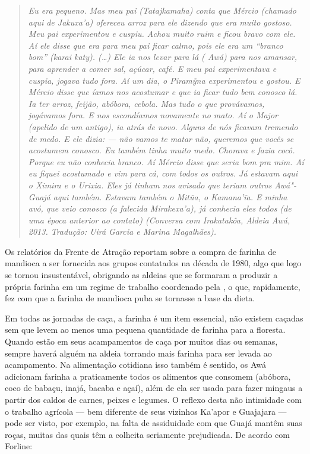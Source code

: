 \begin{quote}
\emph{Eu era pequeno. Mas meu pai (Tatajkamaha) conta que Mércio
(chamado aqui de Jakuxa'a) ofereceu arroz para ele dizendo que era muito
gostoso. Meu pai experimentou e cuspiu. Achou muito ruim e ficou bravo
com ele. Aí ele disse que era para meu pai ficar calmo, pois ele era um
``branco bom'' (karai katy). (\ldots{}) Ele ia nos levar para lá ( Awá)
para nos amansar, para aprender a comer sal, açúcar, café. E meu pai
experimentava e cuspia, jogava tudo fora. Aí um dia, o Piramỹna
experimentou e gostou. E Mércio disse que íamos nos acostumar e que ia
ficar tudo bem conosco lá. Ia ter arroz, feijão, abóbora, cebola. Mas
tudo o que provávamos, jogávamos fora. E nos escondíamos novamente no
mato. Aí o Major (apelido de um antigo), ia atrás de novo. Alguns de nós
ficavam tremendo de medo. E ele dizia: --- não vamos te matar não,
queremos que vocês se acostumem conosco. Eu também tinha muito medo.
Chorava e fazia cocô. Porque eu não conhecia branco. Aí Mércio disse que
seria bom pra mim. Aí eu fiquei acostumado e vim para cá, com todos os
outros. Já estavam aqui o Ximira e o Urixia. Eles já tinham nos avisado
que teriam outros Awá"-Guajá aqui também. Estavam também o Mitũa, o
Kamana'ĩa. E minha avó, que veio conosco (a falecida Mirakexa'a), já
conhecia eles todos (de uma época anterior ao contato) (Conversa com
Irakatakôa, Aldeia Awá, 2013. Tradução: Uirá Garcia e Marina Magalhães).}
\end{quote}

Os relatórios da Frente de Atração reportam sobre a compra de farinha de
mandioca a ser fornecida aos grupos contatados na década de 1980, algo
que logo se tornou insustentável, obrigando as aldeias que se formaram a
produzir a própria farinha em um regime de trabalho coordenado pela
, o que, rapidamente, fez com que a farinha de mandioca puba se
tornasse a base da dieta.

Em todas as jornadas de caça, a farinha é um item essencial, não existem
caçadas sem que levem ao menos uma pequena quantidade de farinha para a
floresta. Quando estão em seus acampamentos de caça por muitos dias ou
semanas, sempre haverá alguém na aldeia torrando mais farinha para ser
levada ao acampamento. Na alimentação cotidiana isso também é sentido,
os Awá adicionam farinha a praticamente todos os alimentos que consomem
(abóbora, coco de babaçu, inajá, bacaba e açaí), além de ela ser usada
para fazer mingaus a partir dos caldos de carnes, peixes e legumes. O
reflexo desta não intimidade com o trabalho agrícola --- bem diferente de
seus vizinhos Ka'apor e Guajajara --- pode ser visto, por exemplo, na
falta de assiduidade com que Guajá mantêm suas roças, muitas das quais
têm a colheita seriamente prejudicada. De acordo com Forline:


